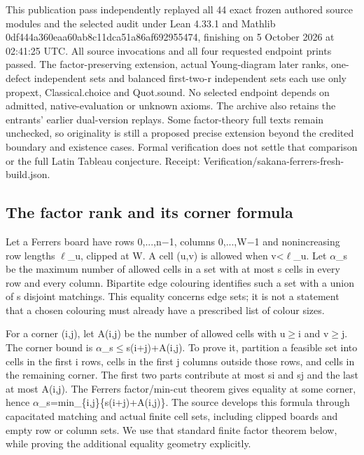 \documentclass[11pt,a4paper]{article}
\begin{document}
This publication pass independently replayed all 44 exact frozen authored source modules and the selected audit under Lean 4.33.1 and Mathlib 0df444a360eaa60ab8c11dca51a86af692955474, finishing on 5 October 2026 at 02:41:25 UTC. All source invocations and all four requested endpoint prints passed. The factor-preserving extension, actual Young-diagram later ranks, one-defect independent sets and balanced first-two-r independent sets each use only propext, Classical.choice and Quot.sound. No selected endpoint depends on admitted, native-evaluation or unknown axioms. The archive also retains the entrants' earlier dual-version replays. Some factor-theory full texts remain unchecked, so originality is still a proposed precise extension beyond the credited boundary and existence cases. Formal verification does not settle that comparison or the full Latin Tableau conjecture. Receipt: Verification/sakana-ferrers-fresh-build.json.

\subsection{The factor rank and its corner formula}
Let a Ferrers board have rows 0,...,n\ensuremath{-}1, columns 0,...,W\ensuremath{-}1 and nonincreasing row lengths \ensuremath{\ell}\_u, clipped at W. A cell (u,v) is allowed when v<\ensuremath{\ell}\_u. Let \ensuremath{\alpha}\_s be the maximum number of allowed cells in a set with at most s cells in every row and every column. Bipartite edge colouring identifies such a set with a union of s disjoint matchings. This equality concerns edge sets; it is not a statement that a chosen colouring must already have a prescribed list of colour sizes.

For a corner (i,j), let A(i,j) be the number of allowed cells with u\ensuremath{\geq}i and v\ensuremath{\geq}j. The corner bound is \ensuremath{\alpha}\_s\ensuremath{\leq}s(i+j)+A(i,j). To prove it, partition a feasible set into cells in the first i rows, cells in the first j columns outside those rows, and cells in the remaining corner. The first two parts contribute at most si and sj and the last at most A(i,j). The Ferrers factor/min-cut theorem gives equality at some corner, hence \ensuremath{\alpha}\_s=min\_\{i,j\}\{s(i+j)+A(i,j)\}. The source develops this formula through capacitated matching and actual finite cell sets, including clipped boards and empty row or column sets. We use that standard finite factor theorem below, while proving the additional equality geometry explicitly.
\end{document}
